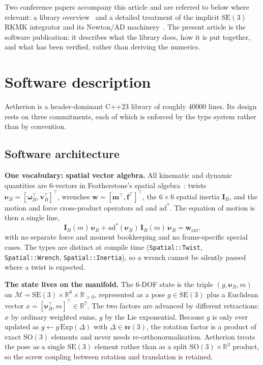 \documentclass[preprint,12pt,a4paper]{elsarticle}
\newcommand{\SO}{\mathrm{SO}(3)}
\newcommand{\SE}{\mathrm{SE}(3)}
\newcommand{\se}{\mathfrak{se}(3)}
\newcommand{\Exp}{\mathrm{Exp}}
\newcommand{\ad}{\mathrm{ad}}
\newcommand{\R}{\mathbb{R}}
\newcommand{\nuB}{\boldsymbol{\nu}_B}
\newcommand{\IB}{\mathbf{I}_B}
\newcommand{\wext}{\mathbf{w}_{\mathrm{ext}}}
\newcommand{\code}[1]{\texttt{\small #1}}
\begin{document}
Two conference papers accompany this article and are referred to below where
relevant: a library overview~\cite{tuncer2027library} and a detailed treatment
of the implicit $\SE$ RKMK integrator and its Newton/AD
machinery~\cite{tuncer2027rkmk}. The present article is the software
publication: it describes what the library does, how it is put together, and
what has been verified, rather than deriving the numerics.

\section{Software description}
\label{sec:description}

Aetherion is a header-dominant C++23 library of roughly \num{40000} lines. Its
design rests on three commitments, each of which is enforced by the type system
rather than by convention.

\subsection{Software architecture}
\label{sec:architecture}

\textbf{One vocabulary: spatial vector algebra.} All kinematic and dynamic
quantities are 6-vectors in Featherstone's spatial
algebra~\cite{featherstone2008rbd}: twists
$\nuB = [\boldsymbol{\omega}_B^\top, \mathbf{v}_B^\top]^\top$, wrenches
$\mathbf{w} = [\mathbf{m}^\top, \mathbf{f}^\top]^\top$, the $6\times6$ spatial
inertia $\IB$, and the motion and force cross-product operators $\ad$ and
$\ad^*$. The equation of motion is then a single line,
\begin{equation}
  \IB(m)\,\dot{\nuB} + \ad^*(\nuB)\,\IB(m)\,\nuB = \wext,
  \label{eq:newton_euler}
\end{equation}
with no separate force and moment bookkeeping and no frame-specific special
cases. The types are distinct at compile time (\code{Spatial::Twist},
\code{Spatial::Wrench}, \code{Spatial::Inertia}), so a wrench cannot be
silently passed where a twist is expected.

\textbf{The state lives on the manifold.} The 6-DOF state is the triple
$(g, \nuB, m)$ on $\mathcal{M} = \SE \times \R^{6} \times \R_{>0}$, represented
as a pose $g \in \SE$ plus a Euclidean vector
$x = [\nuB^\top, m]^\top \in \R^{7}$. The two factors are advanced by different
retractions: $x$ by ordinary weighted sums, $g$ by the Lie exponential. Because
$g$ is only ever updated as $g \leftarrow g\,\Exp(\Delta)$ with $\Delta \in
\se$, the rotation factor is a product of exact $\SO$ elements and never needs
re-orthonormalisation. Aetherion treats the pose as a single $\SE$ element
rather than as a split $\SO \times \R^3$ product, so the screw coupling between
rotation and translation is retained.
\end{document}
